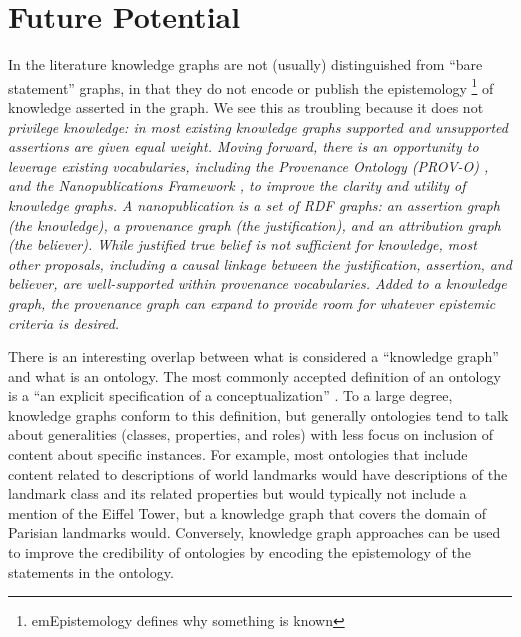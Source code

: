 \section{Future Potential}

In the literature knowledge graphs are not (usually) distinguished from ``bare statement'' graphs, in that they do not encode or publish the epistemology \footnote{em{Epistemology} defines why something is known} of knowledge asserted in the graph.
We see this as troubling because it does not \em{privilege} knowledge: in most existing knowledge graphs supported and unsupported assertions are given equal weight.
Moving forward, there is an opportunity to leverage existing vocabularies, including the Provenance Ontology (PROV-O) \cite{Moreau_2015}, and the Nanopublications Framework \cite{groth2010anatomy}, to improve the clarity and utility of knowledge graphs.
A nanopublication is a set of RDF graphs: an \em{assertion graph} (the knowledge), a \em{provenance graph} (the justification), and an \em{attribution graph} (the believer).
While justified true belief is not sufficient for knowledge, most other proposals, including a causal linkage between the justification, assertion, and believer, are well-supported within provenance vocabularies.
Added to a knowledge graph, the provenance graph can expand to provide room for whatever epistemic criteria is desired.

There is an interesting overlap between what is considered a ``knowledge graph'' and what is an ontology.
The most commonly accepted definition of an ontology is a ``an explicit specification of a conceptualization'' \cite{Gruber_1993}.
To a large degree, knowledge graphs conform to this definition, but generally ontologies tend to talk about generalities (classes, properties, and roles) with less focus on inclusion of content about specific instances.
For example, most ontologies that include content related to descriptions of world landmarks would have descriptions of the landmark class and its related properties but would typically not include a mention of the Eiffel Tower, but a knowledge graph that covers the domain of Parisian landmarks would.
Conversely, knowledge graph approaches can be used to improve the credibility of ontologies by encoding the epistemology of the statements in the ontology.
